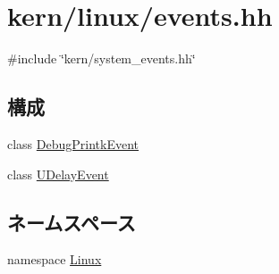 \hypertarget{events_8hh}{
\section{kern/linux/events.hh}
\label{events_8hh}
}
{\ttfamily \#include \char`\"{}kern/system\_\-events.hh\char`\"{}}\par
\subsection*{構成}
\begin{DoxyCompactItemize}
\item 
class \hyperlink{classLinux_1_1DebugPrintkEvent}{DebugPrintkEvent}
\item 
class \hyperlink{classLinux_1_1UDelayEvent}{UDelayEvent}
\end{DoxyCompactItemize}
\subsection*{ネームスペース}
\begin{DoxyCompactItemize}
\item 
namespace \hyperlink{namespaceLinux}{Linux}
\end{DoxyCompactItemize}
